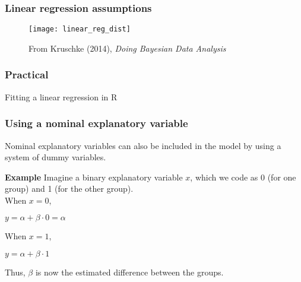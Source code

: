 \documentclass{beamer}
\begin{document}
\begin{frame}
  \frametitle{Linear regression assumptions}
  \begin{figure}
  \texttt{[image: linear\_reg\_dist]}
  \caption{\tiny{From Kruschke (2014), \textit{Doing Bayesian Data Analysis}}}
\end{figure}
\end{frame}
\begin{frame}
  \frametitle{Practical}
  Fitting a linear regression in R
\end{frame}
\begin{frame}
  \frametitle{Using a nominal explanatory variable}
  Nominal explanatory variables can also be included in the model by using a system of \alert{dummy variables}. \\ \vspace{1cm}
  \begin{block}{\textbf{Example}}
    Imagine a binary explanatory variable $x$, which we code as 0 (for one group) and 1 (for the other group).\\
    When $x = 0$, \\
  \begin{centering}
    $y = \alpha + \beta \cdot 0 = \alpha$ \\
  \end{centering}
  When $x = 1$, \\
\begin{centering}
  $y = \alpha + \beta \cdot 1$ \\ \vspace{0.5cm}
  \end{centering}
  Thus, \alert{$\beta$ is now the estimated difference between the groups.}
\end{block}
\end{frame}
\end{document}
